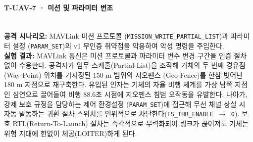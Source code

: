 \paragraph{\textbf{T-UAV-7 · 미션 및 파라미터 변조}} ~\\
\textbf{공격 시나리오:} 
MAVLink 미션 프로토콜 (\texttt{MISSION\_WRITE\_PARTIAL\_LIST})과 파라미터 설정 (\texttt{PARAM\_SET})의 v1 무인증 취약점을 악용하여 악성 명령을 주입한다.\\
\textbf{실험 결과:}
MAVLink 통신은 미션 프로토콜과 파라미터 변수 변경 구간을 인증 절차 없이 수용한다. 공격자가 임무 스케줄(Partial-List)을 조작해 기체의 두 번째 경유점 (Way-Point) 위치를 기지정된 150 m 범위의 지오펜스 (Geo-Fence)를 한참 벗어난 180 m 지점으로 재구축한다. 유입된 인자는 기체의 자율 비행 체계를 가상 남쪽 지점인 심연으로 끌어들여 비행 88.6초 시점에 지오펜스 침범 오작동을 유발한다. 나아가, 강제 보호 규정을 담당하는 제어 환경설정 (\texttt{PARAM\_SET})에 접근해 무선 채널 상실 시 자동 발동하는 귀환 절차 스위치를 인위적으로 차단한다(\texttt{FS\_THR\_ENABLE $\to$ 0}). 보호 RTL(Return-To-Launch) 절차는 즉각적으로 무력화되어 링크가 끊어져도 기체는 위험 지대에 한없이 체공(LOITER)하게 된다.
%
